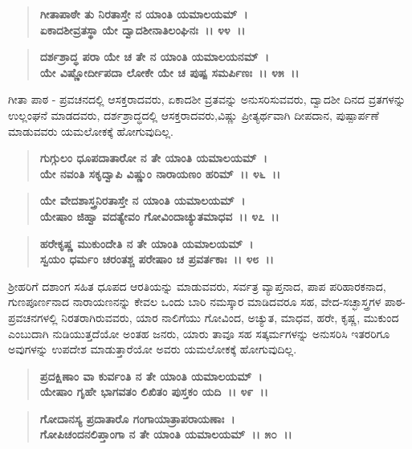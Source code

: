 \begin{verse}
\textbf{ಗೀತಾಪಾಠೇ ತು ನಿರತಾಸ್ತೇ ನ ಯಾಂತಿ ಯಮಾಲಯಮ್~।}\\\textbf{ಏಕಾದಶೀವ್ರತಸ್ಥಾ ಯೇ ದ್ವಾದಶೀನಾತಿಲಂಘಿನಃ~।। ೪೪~।।} 
\end{verse}

\begin{verse}
\textbf{ದರ್ಶಶ್ರಾದ್ಧ ಪರಾ ಯೇ ಚ ತೇ ನ ಯಾಂತಿ ಯಮಾಲಯನಮ್~।}\\\textbf{ಯೇ ವಿಷ್ಣೋರ್ದೀಪದಾ ಲೋಕೇ ಯೇ ಚ ಪುಷ್ಪ ಸಮರ್ಪಿಣಃ~।। ೪೫~।। }
\end{verse}

ಗೀತಾ ಪಾಠ - ಪ್ರವಚನದಲ್ಲಿ ಆಸಕ್ತರಾದವರು, ಏಕಾದಶೀ ವ್ರತವನ್ನು ಅನುಸರಿಸುವವರು, ದ್ವಾದಶೀ ದಿನದ ವ್ರತಗಳನ್ನು ಉಲ್ಲಂಘನೆ ಮಾಡದವರು, ದರ್ಶಶ್ರಾದ್ಧದಲ್ಲಿ ಆಸಕ್ತ\break ರಾದವರು,ವಿಷ್ಣು ಪ್ರೀತ್ಯರ್ಥವಾಗಿ ದೀಪದಾನ, ಪುಷ್ಪಾರ್ಪಣೆ ಮಾಡುವವರು ಯಮಲೋಕಕ್ಕೆ ಹೋಗುವುದಿಲ್ಲ.

\begin{verse}
\textbf{ಗುಗ್ಗುಲಂ ಧೂಪದಾತಾರೋ ನ ತೇ ಯಾಂತಿ ಯಮಾಲಯಮ್~।}\\\textbf{ಯೇ ನವಂತಿ ಸಕೃದ್ವಾಪಿ ವಿಷ್ಣುಂ ನಾರಾಯಣಂ ಹರಿಮ್~।। ೪೬~।। }
\end{verse}

\begin{verse}
\textbf{ಯೇ ವೇದಶಾಸ್ತ್ರನಿರತಾಸ್ತೇ ನ ಯಾಂತಿ ಯಮಾಲಯಮ್~।}\\\textbf{ಯೇಷಾಂ ಜಿಹ್ವಾ ವದತ್ಯೇವಂ ಗೋವಿಂದಾಚ್ಯುತಮಾಧವ~।। ೪೭~।।}
\end{verse}

\begin{verse}
\textbf{ಹರೇಕೃಷ್ಣ ಮುಕುಂದೇತಿ ನ ತೇ ಯಾಂತಿ ಯಮಾಲಯಮ್~।}\\\textbf{ಸ್ವಯಂ ಧರ್ಮಂ ಚರಂತಶ್ಚ ಪರೇಷಾಂ ಚ ಪ್ರವರ್ತಕಾಃ~।। ೪೮~।।}
\end{verse}

ಶ‍್ರೀಹರಿಗೆ ದಶಾಂಗ ಸಹಿತ ಧೂಪದ ಆರತಿಯನ್ನು ಮಾಡುವವರು, ಸರ್ವತ್ರ ವ್ಯಾಪ್ತನಾದ, ಪಾಪ ಪರಿಹಾರಕನಾದ, ಗುಣಪೂರ್ಣನಾದ ನಾರಾಯಣನನ್ನು ಕೇವಲ ಒಂದು ಬಾರಿ ನಮಸ್ಕಾರ ಮಾಡಿದವರೂ ಸಹ, ವೇದ-ಸಚ್ಛಾಸ್ತ್ರಗಳ ಪಾಠ-ಪ್ರವಚನಗಳಲ್ಲಿ ನಿರತರಾಗಿರುವವರು, ಯಾರ ನಾಲಿಗೆಯು ಗೋವಿಂದ, ಅಚ್ಯುತ, ಮಾಧವ, ಹರೇ, ಕೃಷ್ಣ, ಮುಕುಂದ ಎಂಬುದಾಗಿ ನುಡಿಯುತ್ತದೆಯೋ ಅಂತಹ ಜನರು, ಯಾರು ತಾವೂ ಸಹ ಸತ್ಕರ್ಮಗಳನ್ನು ಅನುಸರಿಸಿ ಇತರರಿಗೂ ಅವುಗಳನ್ನು ಉಪದೇಶ ಮಾಡುತ್ತಾರೆಯೋ ಅವರು ಯಮಲೋಕಕ್ಕೆ ಹೋಗುವುದಿಲ್ಲ.

\begin{verse}
\textbf{ಪ್ರದಕ್ಷಿಣಾಂ ವಾ ಕುರ್ವಂತಿ ನ ತೇ ಯಾಂತಿ ಯಮಾಲಯಮ್~।}\\\textbf{ಯೇಷಾಂ ಗೃಹೇ ಭಾಗವತಂ ಲಿಖಿತಂ ಪುಸ್ತಕಂ ಯದಿ~।। ೪೯~।। }
\end{verse}

\begin{verse}
\textbf{ಗೋದಾನಸ್ಯ ಪ್ರದಾತಾರೊ ಗಂಗಾಯಾತ್ರಾಪರಾಯಣಾಃ~।}\\\textbf{ಗೋಪಿಚಂದನಲಿಪ್ತಾಂಗಾ ನ ತೇ ಯಾಂತಿ ಯಮಾಲಯಮ್~।। ೫೦~।। }
\end{verse}

